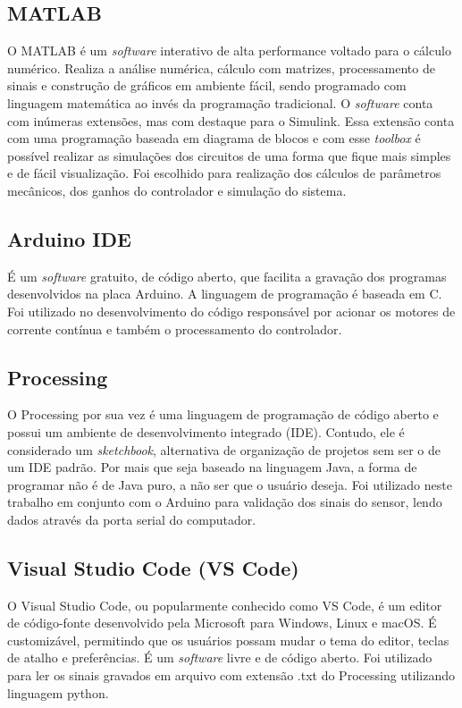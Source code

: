 \subsection{MATLAB}

O MATLAB é um \textit{software} interativo de alta performance voltado para o cálculo numérico. Realiza a análise numérica, cálculo com matrizes, processamento de sinais e construção de gráficos em ambiente fácil, sendo programado com linguagem matemática ao invés da programação tradicional. O \textit{software} conta com inúmeras extensões, mas com destaque para o Simulink. Essa extensão conta com uma programação baseada em diagrama de blocos e com esse \textit{toolbox} é possível realizar as simulações dos circuitos de uma forma que fique mais simples e de fácil visualização. Foi escolhido para realização dos cálculos de parâmetros mecânicos, dos ganhos do controlador e simulação do sistema.

\subsection{Arduino IDE}

É um \textit{software} gratuito, de código aberto, que facilita a gravação dos programas desenvolvidos na placa Arduino. A linguagem de programação é baseada em C. Foi utilizado no desenvolvimento do código responsável por acionar os motores de corrente contínua e também o processamento do controlador.

\subsection{Processing}

O Processing por sua vez é uma linguagem de programação de código aberto e possui um ambiente de desenvolvimento integrado (IDE). Contudo, ele é considerado um \textit{sketchbook}, alternativa de organização de projetos sem ser o de um IDE padrão. Por mais que seja baseado na linguagem Java, a forma de programar não é de Java puro, a não ser que o usuário deseja. Foi utilizado neste trabalho em conjunto com o Arduino para validação dos sinais do sensor, lendo dados através da porta serial do computador.

\subsection{Visual Studio Code (VS Code)}

O Visual Studio Code, ou popularmente conhecido como VS Code, é um editor de código-fonte desenvolvido pela Microsoft para Windows, Linux e macOS. É customizável, permitindo que os usuários possam mudar o tema do editor, teclas de atalho e preferências. É um \textit{software} livre e de código aberto. Foi utilizado para ler os sinais gravados em arquivo com extensão .txt do Processing utilizando linguagem python.


